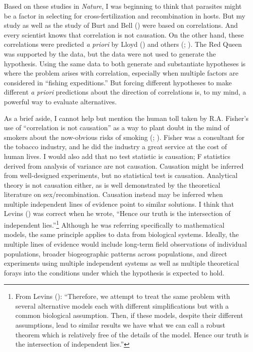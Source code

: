 \documentclass[
  american,
  letterpaper,
]{book}
\begin{document}
Based on these studies in \emph{Nature}, I was beginning to think that
parasites might be a factor in selecting for cross-fertilization and
recombination in hosts. But my study as well as the study of Burt and
Bell () were based on correlations. And
every scientist knows that correlation is not causation. On the other
hand, these correlations were predicted \emph{a priori} by Lloyd
() and others
(;
). The Red Queen
was supported by the data, but the data were not used to generate the
hypothesis. Using the same data to both generate and substantiate
hypotheses is where the problem arises with correlation, especially when
multiple factors are considered in ``fishing expeditions.'' But forcing
different hypotheses to make different \emph{a priori} predictions about
the direction of correlations is, to my mind, a powerful way to evaluate
alternatives.

As a brief aside, I cannot help but mention the human toll taken by R.A.
Fisher's use of ``correlation is not causation'' as a way to plant doubt
in the mind of smokers about the now-obvious risks of smoking
(;
). Fisher was a consultant for
the tobacco industry, and he did the industry a great service at the
cost of human lives. I would also add that no test statistic is
causation; F statistics derived from analysis of variance are not
causation. Causation might be inferred from well-designed experiments,
but no statistical test is causation. Analytical theory is not causation
either, as is well demonstrated by the theoretical literature on
sex/recombination. Causation instead may be inferred when multiple
independent lines of evidence point to similar solutions. I think that
Levins () was correct when he wrote,
``Hence our truth is the intersection of independent lies.''\footnote{From
  Levins (): ``Therefore, we attempt to
  treat the same problem with several alternative models each with
  different simplifications but with a common biological assumption.
  Then, if these models, despite their different assumptions, lead to
  similar results we have what we can call a robust theorem which is
  relatively free of the details of the model. Hence our truth is the
  intersection of independent lies.''} Although he was referring
specifically to mathematical models, the same principle applies to data
from biological systems. Ideally, the multiple lines of evidence would
include long-term field observations of individual populations, broader
biogeographic patterns across populations, and direct experiments using
multiple independent systems as well as multiple theoretical forays into
the conditions under which the hypothesis is expected to hold.
\end{document}
